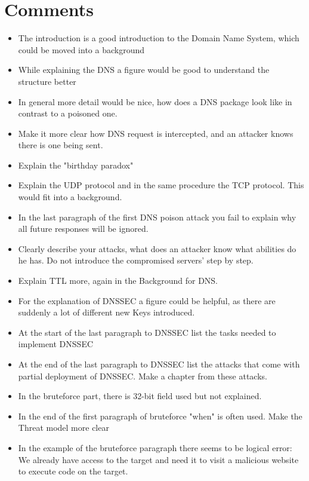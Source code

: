 \documentclass[peerreview, 10pt, onecolumn]{IEEEtran}
\begin{document}
\section*{Comments}
    \begin{itemize}
        \item The introduction is a good introduction to the Domain Name System, which could be moved into a background
        \item While explaining the DNS a figure would be good to understand the structure better
        \item In general more detail would be nice, how does a DNS package look like in contrast to a poisoned one.
        \item Make it more clear how DNS request is intercepted, and an attacker knows there is one being sent.
        \item Explain the "birthday paradox"
        \item Explain the UDP protocol and in the same procedure the TCP protocol. This would fit into a background.
        \item In the last paragraph of the first DNS poison attack you fail to explain why all future responses will be ignored. 
        \item Clearly describe your attacks, what does an attacker know what abilities do he has. Do not introduce the compromised servers' step by step. 
        \item Explain TTL more, again in the Background for DNS. 
        \item For the explanation of DNSSEC a figure could be helpful, as there are suddenly a lot of different new Keys introduced.
        \item At the start of the last paragraph to DNSSEC list the tasks needed to implement DNSSEC
        \item At the end of the last paragraph to DNSSEC list the attacks that come with partial deployment of DNSSEC. Make a chapter from these attacks.
        \item In the bruteforce part, there is 32-bit field used but not explained.
        \item In the end of the first paragraph of bruteforce "when" is often used. Make the Threat model more clear
        \item In the example of the bruteforce paragraph there seems to be logical error: We already have access to the target and need it to visit a malicious website to execute code on the target.

\end{itemize}
\end{document}
